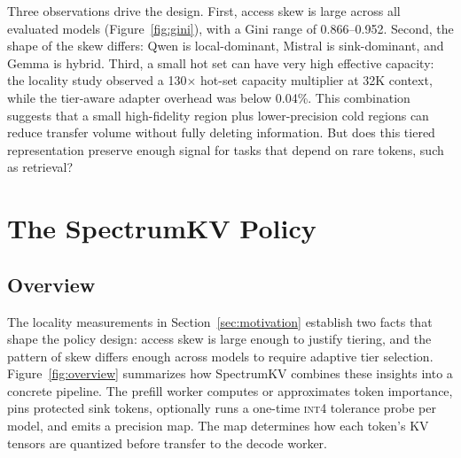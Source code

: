 \documentclass[11pt]{article}
\newcommand{\method}{SpectrumKV}
\newcommand{\pct}{\%}
\newcommand{\intiv}{\textsc{int4}}
\theoremstyle{plain}
\theoremstyle{definition}
\begin{document}
Three observations drive the design.  First, access skew is large across all evaluated models (Figure~\ref{fig:gini}), with a Gini range of 0.866--0.952.  Second, the shape of the skew differs: Qwen is local-dominant, Mistral is sink-dominant, and Gemma is hybrid.  Third, a small hot set can have very high effective capacity: the locality study observed a 130$\times$ hot-set capacity multiplier at 32K context, while the tier-aware adapter overhead was below 0.04\pct{}.  This combination suggests that a small high-fidelity region plus lower-precision cold regions can reduce transfer volume without fully deleting information.  But does this tiered representation preserve enough signal for tasks that depend on rare tokens, such as retrieval?

\section{The \method{} Policy}
\label{sec:method}

\subsection{Overview}

The locality measurements in Section~\ref{sec:motivation} establish two facts that shape the policy design: access skew is large enough to justify tiering, and the pattern of skew differs enough across models to require adaptive tier selection.  Figure~\ref{fig:overview} summarizes how \method{} combines these insights into a concrete pipeline.  The prefill worker computes or approximates token importance, pins protected sink tokens, optionally runs a one-time \intiv{} tolerance probe per model, and emits a precision map.  The map determines how each token's KV tensors are quantized before transfer to the decode worker.
\end{document}
